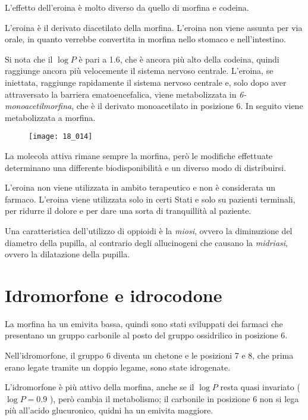 
L'effetto dell'eroina è molto diverso da quello di morfina e codeina.

L'eroina è il derivato diacetilato della morfina. L'eroina non viene
assunta per via orale, in quanto verrebbe convertita in morfina nello
stomaco e nell'intestino.

Si nota che il \(\log{} P\) è pari a 1.6, che è ancora più alto della
codeina, quindi raggiunge ancora più velocemente il sistema nervoso
centrale. L'eroina, se iniettata, raggiunge rapidamente il sistema
nervoso centrale e, solo dopo aver attraversato la barriera
ematoencefalica, viene metabolizzata in
\emph{6-monoacetilmorfina},
che è il derivato monoacetilato in posizione 6. In seguito viene
metabolizzata a morfina.
\begin{figure}[H]
  \centering
  \texttt{[image: 18\_014]}
\end{figure}

La molecola attiva rimane sempre la morfina, però le modifiche
effettuate determinano una differente biodisponibilità e un diverso modo
di distribuirsi.

L'eroina non viene utilizzata in ambito terapeutico e non è considerata
un farmaco. L'eroina viene utilizzata solo in certi Stati e solo su
pazienti terminali, per ridurre il dolore e per dare una sorta di
tranquillità al paziente.

Una caratteristica dell'utilizzo di oppioidi è la \emph{miosi}, ovvero
la diminuzione del diametro della pupilla, al contrario degli
allucinogeni che causano la \emph{midriasi}, ovvero la dilatazione della
pupilla.

\section{Idromorfone e idrocodone}

La morfina ha un emivita bassa, quindi sono stati sviluppati dei farmaci
che presentano un gruppo carbonile al posto del gruppo ossidrilico in
posizione 6.

Nell'idromorfone, il gruppo 6 diventa un chetone e le posizioni 7 e 8,
che prima erano legate tramite un doppio legame, sono state idrogenate.

L'idromorfone è più attivo della morfina, anche se il \(\log{} P\) resta
quasi invariato (\(\log{} P = 0.9\) ), però cambia il metabolismo; il
carbonile in posizione 6 non si lega più all'acido glucuronico, quidni
ha un emivita maggiore.

